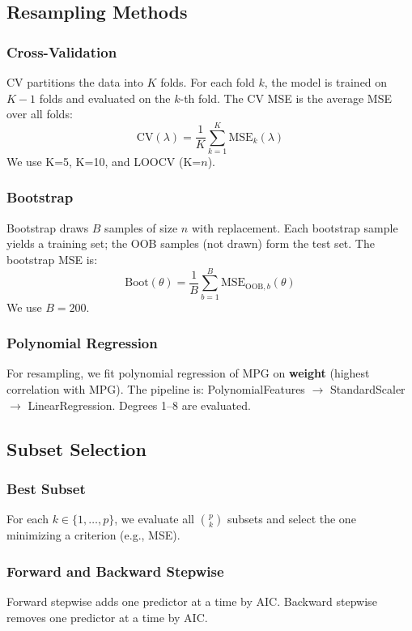 \documentclass[conference]{IEEEtran}
\begin{document}
\subsection{Resampling Methods}
\label{sec:resampling}

\subsubsection{Cross-Validation}
CV partitions the data into $K$ folds. For each fold $k$, the model is trained on $K-1$ folds and evaluated on the $k$-th fold. The CV MSE is the average MSE over all folds:
\begin{equation}
\text{CV}(\lambda) = \frac{1}{K}\sum_{k=1}^{K} \text{MSE}_k(\lambda)
\end{equation}
We use K=5, K=10, and LOOCV (K=$n$).

\subsubsection{Bootstrap}
Bootstrap draws $B$ samples of size $n$ with replacement. Each bootstrap sample yields a training set; the OOB samples (not drawn) form the test set. The bootstrap MSE is:
\begin{equation}
\text{Boot}(\theta) = \frac{1}{B}\sum_{b=1}^{B} \text{MSE}_{\text{OOB},b}(\theta)
\end{equation}
We use $B=200$.

\subsubsection{Polynomial Regression}
For resampling, we fit polynomial regression of MPG on \textbf{weight} (highest correlation with MPG). The pipeline is: PolynomialFeatures $\rightarrow$ StandardScaler $\rightarrow$ LinearRegression. Degrees 1--8 are evaluated.

\subsection{Subset Selection}
\label{sec:subset}

\subsubsection{Best Subset}
For each $k \in \{1,\ldots,p\}$, we evaluate all $\binom{p}{k}$ subsets and select the one minimizing a criterion (e.g., MSE).

\subsubsection{Forward and Backward Stepwise}
Forward stepwise adds one predictor at a time by AIC. Backward stepwise removes one predictor at a time by AIC.
\end{document}
